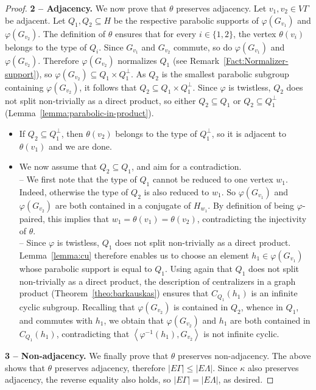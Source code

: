 \documentclass[a4paper,english,11pt]{article}
\theoremstyle{definition}
\theoremstyle{remark}
\begin{document}
\begin{proof}
\textbf{2 – Adjacency.} We now prove that $\theta$ preserves adjacency. Let $v_1,v_2\in V\Gamma$ be adjacent. Let $Q_1,Q_2\subseteq H$ be the respective parabolic supports of $\varphi(G_{v_1})$ and $\varphi(G_{v_2})$. The definition of $\theta$ ensures that for every $i\in\{1,2\}$, the vertex $\theta(v_i)$ belongs to the type of $Q_i$. Since $G_{v_1}$ and $G_{v_2}$ commute, so do $\varphi(G_{v_1})$ and $\varphi(G_{v_2})$. Therefore $\varphi(G_{v_2})$ normalizes $Q_1$ (see Remark~\ref{Fact:Normalizer-support}), so $\varphi(G_{v_2})\subseteq Q_1\times Q_1^\perp$. As $Q_2$ is the smallest parabolic subgroup containing $\varphi(G_{v_2})$, it follows that $Q_2\subseteq Q_1\times Q_1^\perp$. Since $\varphi$ is twistless, $Q_2$ does not split non-trivially as a direct product, so either $Q_2\subseteq Q_1$ or $Q_2\subseteq Q_1^\perp$ (Lemma~\ref{lemma:parabolic-in-product}).
\begin{itemize}
\item If $Q_2\subseteq Q_1^\perp$, then $\theta(v_2)$ belongs to the type of $Q_1^\perp$, so it is adjacent to $\theta(v_1)$ and we are done. 
\item We now assume that $Q_2\subseteq Q_1$, and aim for a contradiction.
\\ -- We first note that the type of $Q_1$ cannot be reduced to one vertex $w_1$. Indeed, otherwise the type of $Q_2$ is also reduced to $w_1$. So $\varphi(G_{v_1})$ and $\varphi(G_{v_2})$ are both contained in a conjugate of $H_{w_1}$. By definition of being $\varphi$-paired, this implies that $w_1=\theta(v_1)=\theta(v_2)$, contradicting the injectivity of $\theta$.   
\\ -- Since $\varphi$ is twistless, $Q_1$ does not split non-trivially as a
direct product. Lemma~\ref{lemma:cu} therefore enables us to choose an element
$h_1\in\varphi(G_{v_1})$ whose parabolic support is equal to $Q_1$.
Using again that $Q_1$ does not split non-trivially as a direct product, the description of centralizers in a graph product (Theorem~\ref{theo:barkauskas}) ensures that $C_{Q_1}(h_1)$ is an infinite cyclic subgroup. Recalling that $\varphi(G_{v_2})$ is contained in $Q_2$, whence in $Q_1$, and commutes with $h_1$, we obtain that $\varphi(G_{v_2})$ and $h_1$ are both contained in $C_{Q_1}(h_1)$, contradicting that $\left\langle{\varphi^{-1}(h_1),G_{v_2}}\right\rangle$ is not infinite cyclic.
\end{itemize}

\medskip

\textbf{3 – Non-adjacency.} We finally prove that $\theta$ preserves non-adjacency. The above shows that $\theta$ preserves adjacency, therefore $|E\Gamma|\le |E\Lambda|$. Since $\kappa$ also preserves adjacency, the reverse equality also holds, so $|E\Gamma|=|E\Lambda|$, as desired. 
\end{proof}
\end{document}
